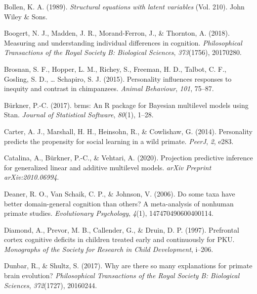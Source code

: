 \documentclass[
  man,floatsintext]{apa6}
\newlength{\cslhangindent}
\newlength{\cslentryspacingunit} %
\newenvironment{CSLReferences}[2] %
 {%
  \setlength{\parindent}{0pt}
  \ifodd #1
  \let\oldpar\par
  \def\par{\hangindent=\cslhangindent\oldpar}
  \fi
  \setlength{\parskip}{#2\cslentryspacingunit}
 }%
 {}
\begin{document}
\begin{CSLReferences}{1}{0}
\leavevmode{}%
Bollen, K. A. (1989). \emph{Structural equations with latent variables} (Vol. 210). John Wiley \& Sons.

\leavevmode{}%
Boogert, N. J., Madden, J. R., Morand-Ferron, J., \& Thornton, A. (2018). Measuring and understanding individual differences in cognition. \emph{Philosophical Transactions of the Royal Society B: Biological Sciences}, \emph{373}(1756), 20170280.

\leavevmode{}%
Brosnan, S. F., Hopper, L. M., Richey, S., Freeman, H. D., Talbot, C. F., Gosling, S. D., \ldots{} Schapiro, S. J. (2015). Personality influences responses to inequity and contrast in chimpanzees. \emph{Animal Behaviour}, \emph{101}, 75--87.

\leavevmode{}%
Bürkner, P.-C. (2017). {brms}: An {R} package for {Bayesian} multilevel models using {Stan}. \emph{Journal of Statistical Software}, \emph{80}(1), 1--28.

\leavevmode{}%
Carter, A. J., Marshall, H. H., Heinsohn, R., \& Cowlishaw, G. (2014). Personality predicts the propensity for social learning in a wild primate. \emph{PeerJ}, \emph{2}, e283.

\leavevmode{}%
Catalina, A., Bürkner, P.-C., \& Vehtari, A. (2020). Projection predictive inference for generalized linear and additive multilevel models. \emph{arXiv Preprint arXiv:2010.06994}.

\leavevmode{}%
Deaner, R. O., Van Schaik, C. P., \& Johnson, V. (2006). Do some taxa have better domain-general cognition than others? A meta-analysis of nonhuman primate studies. \emph{Evolutionary Psychology}, \emph{4}(1), 147470490600400114.

\leavevmode{}%
Diamond, A., Prevor, M. B., Callender, G., \& Druin, D. P. (1997). Prefrontal cortex cognitive deficits in children treated early and continuously for PKU. \emph{Monographs of the Society for Research in Child Development}, i--206.

\leavevmode{}%
Dunbar, R., \& Shultz, S. (2017). Why are there so many explanations for primate brain evolution? \emph{Philosophical Transactions of the Royal Society B: Biological Sciences}, \emph{372}(1727), 20160244.


\end{CSLReferences}
\end{document}
